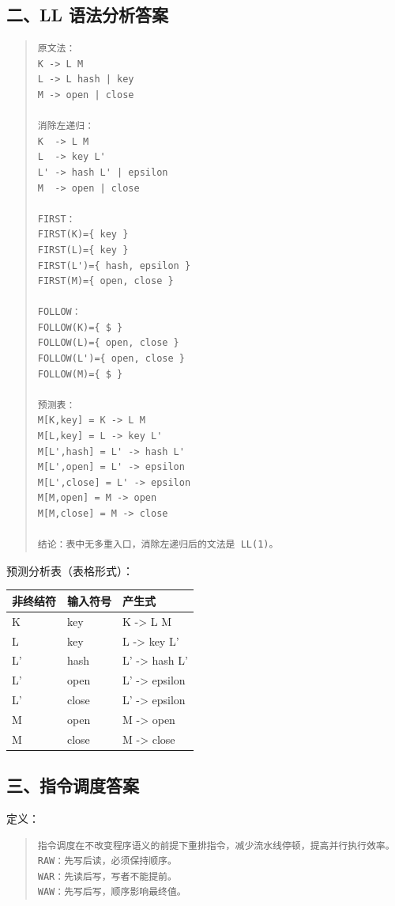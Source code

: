 \documentclass[UTF8,zihao=-4]{ctexart}
\begin{document}
\subsection{二、LL 语法分析答案}


\begin{quote}
\footnotesize
\begin{verbatim}
原文法：
K -> L M
L -> L hash | key
M -> open | close

消除左递归：
K  -> L M
L  -> key L'
L' -> hash L' | epsilon
M  -> open | close

FIRST：
FIRST(K)={ key }
FIRST(L)={ key }
FIRST(L')={ hash, epsilon }
FIRST(M)={ open, close }

FOLLOW：
FOLLOW(K)={ $ }
FOLLOW(L)={ open, close }
FOLLOW(L')={ open, close }
FOLLOW(M)={ $ }

预测表：
M[K,key] = K -> L M
M[L,key] = L -> key L'
M[L',hash] = L' -> hash L'
M[L',open] = L' -> epsilon
M[L',close] = L' -> epsilon
M[M,open] = M -> open
M[M,close] = M -> close

结论：表中无多重入口，消除左递归后的文法是 LL(1)。
\end{verbatim}
\end{quote}

预测分析表（表格形式）：

\begin{center}
\footnotesize
\begin{tabular}{lll}
\hline
非终结符 & 输入符号 & 产生式 \\
\hline
K & key & K -> L M \\
L & key & L -> key L' \\
L' & hash & L' -> hash L' \\
L' & open & L' -> epsilon \\
L' & close & L' -> epsilon \\
M & open & M -> open \\
M & close & M -> close \\
\hline
\end{tabular}
\end{center}



\subsection{三、指令调度答案}


定义：


\begin{quote}
\footnotesize
\begin{verbatim}
指令调度在不改变程序语义的前提下重排指令，减少流水线停顿，提高并行执行效率。
RAW：先写后读，必须保持顺序。
WAR：先读后写，写者不能提前。
WAW：先写后写，顺序影响最终值。
\end{verbatim}
\end{quote}
\end{document}
